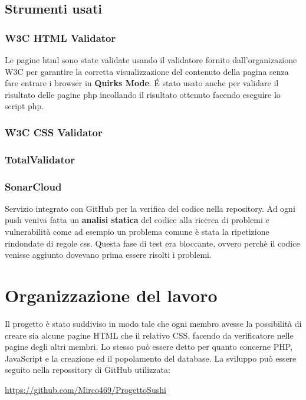 \documentclass{article}
\begin{document}
		\subsection{Strumenti usati}
			\subsubsection{W3C HTML Validator}
				Le pagine html sono state validate usando il validatore fornito dall'organizazione W3C per garantire la corretta visualizzazione del contenuto della pagina senza fare entrare i browser in {\bfseries Quirks Mode}. \'E stato usato anche per validare il risultato delle pagine php incollando il risultato ottenuto facendo eseguire lo script php.
			\subsubsection{W3C CSS Validator}
			\subsubsection{TotalValidator}
			\subsubsection{SonarCloud}
				Servizio integrato con GitHub per la verifica del codice nella repository. Ad ogni push veniva fatta un {\bfseries analisi statica} del codice alla ricerca di problemi e vulnerabilità come ad esempio un problema comune è stata la ripetizione rindondate di regole css. Questa fase di test era bloccante, ovvero perchè il codice venisse aggiunto dovevano prima essere risolti i problemi.
	\section{Organizzazione del lavoro}
		Il progetto è stato suddiviso in modo tale che ogni membro avesse la possibilità di creare sia alcune pagine HTML che il relativo CSS, facendo da verificatore nelle pagine degli altri membri.
		Lo stesso può essere detto per quanto concerne PHP, JavaScript e la creazione ed il popolamento del database.
		La sviluppo può essere seguito nella repossitory di GitHub utilizzata:
		\newline
		\newline
		\centerline{ \url{https://github.com/Mirco469/ProgettoSushi}}
\end{document}
